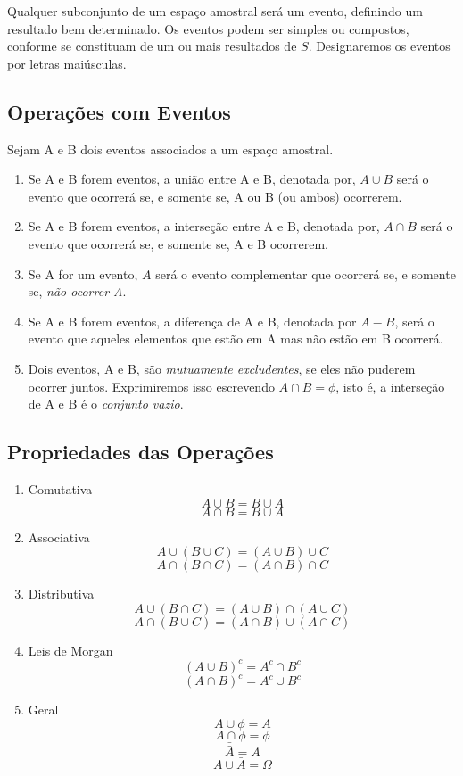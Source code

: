 Qualquer subconjunto de um espaço amostral será um evento,
definindo um resultado bem determinado. Os eventos podem ser
simples ou compostos, conforme se constituam de um ou mais
resultados de $S$. Designaremos os eventos por letras maiúsculas.


\subsection{Operações com Eventos}

Sejam A e B dois eventos associados a um espaço amostral.

\begin{enumerate}
    \item Se A e B forem eventos, a união entre A e B, denotada por, $A \cup B$ será o evento que
    ocorrerá se, e somente se, A ou B (ou ambos) ocorrerem.
    \item Se A e B forem eventos, a interseção entre A e B, denotada por, $A \cap B$ será o evento que
    ocorrerá se, e somente se, A e B ocorrerem.
    \item Se A for um evento, $\bar{A}$ será o evento complementar que ocorrerá
    se, e somente se, \emph{não ocorrer A}.
    \item Se A e B forem eventos, a diferença de A e B, denotada
    por $A-B$, será o evento que aqueles elementos que estão em A mas
    não estão em B ocorrerá.
    \item Dois eventos, A e B, são \emph{mutuamente excludentes}, se eles
    não puderem ocorrer juntos. Exprimiremos isso escrevendo $A \cap B =
    \phi$, isto é, a interseção de A e B é o \emph{conjunto vazio}.
\end{enumerate}


\newpage
\subsection{Propriedades das Operações}

\begin{enumerate}
    \item Comutativa
$$A \cup B = B \cup A$$
$$A \cap B = B \cup A$$
    \item Associativa
$$A \cup (B \cup C) = (A \cup B)\cup C$$
$$A \cap (B \cap C) = (A \cap B)\cap C$$
    \item Distributiva
$$A \cup (B \cap C) = (A \cup B)\cap (A \cup C)$$
$$A \cap (B \cup C) = (A \cap B)\cup (A \cap C)$$
    \item Leis de Morgan
$$ (A \cup B)^{c}= A^{c} \cap B^{c}$$
$$ (A \cap B)^{c}= A^{c} \cup B^{c}$$
\item Geral
$$ A \cup \phi = A$$
$$ A \cap \phi = \phi$$
$$ \bar{\bar{A}}=A $$
$$ A \cup \bar{A}= \Omega $$
\end{enumerate}
















